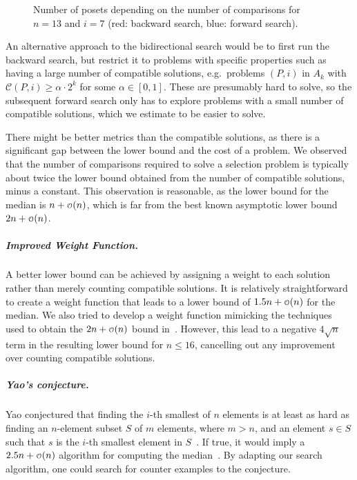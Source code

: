 \documentclass[a4paper,UKenglish,cleveref, autoref, thm-restate]{lipics-v2021}
\newcommand\smallO{
\mathchoice
{{\scriptstyle\mathcal{O}}}%
{{\scriptstyle\mathcal{O}}}%
{{\scriptscriptstyle\mathcal{O}}}%
{\scalebox{.50}{$\scriptscriptstyle\mathcal{O}$}}%
}
\begin{document}
\begin{figure}[!b]
  \centering
  
  \caption{Number of posets depending on the number of comparisons for $n = 13$ and $i = 7$ (red: backward search, blue: forward search).}
  \label{fig:backward_forward_count_13_6}
\end{figure}

An alternative approach to the bidirectional search would be to first run the backward search, but restrict it to problems with specific properties such as having a large number of compatible solutions, e.g.\ problems $(P, i)$ in $A_k$ with $\mathcal{C}(P, i) \ge \alpha \cdot 2^k$ for some $\alpha \in [0, 1]$.
These are presumably hard to solve, so the subsequent forward search only has to explore problems with a small number of compatible solutions, which we estimate to be easier to solve.

There might be better metrics than the compatible solutions, as there is a significant gap between the lower bound and the cost of a problem.
We observed that the number of comparisons required to solve a selection problem is typically about twice the lower bound obtained from the number of compatible solutions, minus a constant.
This observation is reasonable, as the lower bound for the median is $n + \smallO(n)$, which is far from the best known asymptotic lower bound $2n + \smallO(n)$.

\subparagraph{Improved Weight Function.}
A better lower bound can be achieved by assigning a weight to each solution rather than merely counting compatible solutions.
It is relatively straightforward to create a weight function that leads to a lower bound of $1.5n + \smallO(n)$ for the median.
We also tried to develop a weight function mimicking the techniques used to obtain the $2n + \smallO(n)$ bound in~\cite{bent1985finding}.
However, this lead to a negative $4\sqrt{n}$ term in the resulting lower bound for $n \leq 16$, cancelling out any improvement over counting compatible solutions.
\enlargethispage{\baselineskip}

\subparagraph{Yao's conjecture.}
Yao conjectured that finding the $i$-th smallest of $n$ elements is at least as hard as finding an $n$-element subset $S$ of $m$ elements, where $m > n$, and an element $s \in S$ such that $s$ is the $i$-th smallest element in $S$~\cite{yao1974lower}.
If true, it would imply a $2.5n + \smallO(n)$ algorithm for computing the median~\cite{schonhage1975finding}.
By adapting our search algorithm, one could search for counter examples to the conjecture.
\end{document}
